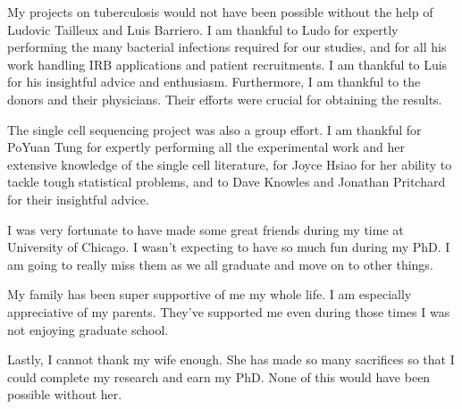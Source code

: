 My projects on tuberculosis would not have been possible without the
help of Ludovic Tailleux and Luis Barriero. I am thankful to Ludo for
expertly performing the many bacterial infections required for our
studies, and for all his work handling IRB applications and patient
recruitments. I am thankful to Luis for his insightful advice and
enthusiasm. Furthermore, I am thankful to the donors and their
physicians. Their efforts were crucial for obtaining the results.

The single cell sequencing project was also a group effort. I am
thankful for PoYuan Tung for expertly performing all the experimental
work and her extensive knowledge of the single cell literature, for
Joyce Hsiao for her ability to tackle tough statistical problems, and
to Dave Knowles and Jonathan Pritchard for their insightful advice.

I was very fortunate to have made some great friends during my time at
University of Chicago. I wasn't expecting to have so much fun during
my PhD. I am going to really miss them as we all graduate and move on
to other things.

My family has been super supportive of me my whole life. I am
especially appreciative of my parents. They've supported me even
during those times I was not enjoying graduate school.

Lastly, I cannot thank my wife enough. She has made so many sacrifices
so that I could complete my research and earn my PhD. None of this
would have been possible without her.
